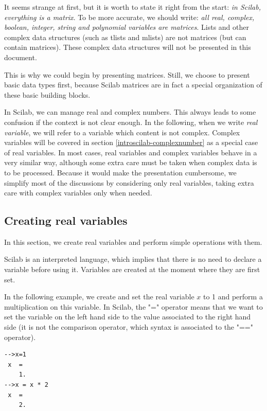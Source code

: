 It seems strange at first, but it is worth to state it
right from the start: \emph{in Scilab, everything is a matrix}.
To be more accurate, we should write: \emph{all real, complex,
boolean, integer, string and polynomial variables are matrices}. 
Lists and other complex data structures (such as tlists and mlists) 
are not matrices (but can contain matrices). These complex data 
structures will not be presented in this document.

This is why we could begin by presenting matrices.
Still, we choose to present basic data types first, because 
Scilab matrices are in fact a special organization of these 
basic building blocks.

In Scilab, we can manage real and complex numbers. This always 
leads to some confusion if the context is not clear enough.
In the following, when we write \emph{real variable}, we will 
refer to a variable which content is not complex. Complex variables
will be covered in section \ref{introscilab-complexnumber} as 
a special case of real variables. In most cases, 
real variables and complex variables behave in a very similar way,
although some extra care must be taken when complex data is to 
be processed. Because it would make the presentation cumbersome, 
we simplify most of the discussions by considering only real variables,
taking extra care with complex variables only when needed.

\subsection{Creating real variables}

In this section, we create real variables and perform simple operations with 
them.
 
Scilab is an interpreted language, which implies that 
there is no need to declare a variable before using it.
Variables are created at the moment where they are first set. 

In the following example, we create and set the real variable $x$ to 1
and perform a multiplication on this variable.
In Scilab, the "=" operator means that we want to set the variable on the 
left hand side to the value associated to the right hand side (it is 
not the comparison operator, which syntax is associated to the "==" operator).
\lstset{language=scilabscript}
\begin{lstlisting}
-->x=1
 x  =
    1.  
-->x = x * 2
 x  =
    2.  
\end{lstlisting}

